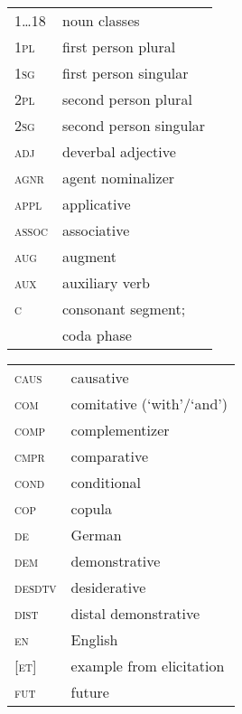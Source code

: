 \begin{multicols}{2} 


\begin{tabular}{lp{4.5cm}} 
1\ldots 18 &noun classes\\
\textsc{1pl} &first person plural\\
\textsc{1sg}&first person singular\\
\textsc{2pl}&second person plural\\
\textsc{2sg}&second person singular\\
\textsc{adj}&deverbal adjective\\
\textsc{agnr}&agent nominalizer\\
\textsc{appl}&applicative\\
\textsc{assoc}&associative\\
\textsc{aug}&augment\\
\textsc{aux}&auxiliary verb\\
\textsc{c} & consonant segment;\\
&coda phase\\
\end{tabular}
\columnbreak

\begin{tabular}{lp{4.5cm}} 
\textsc{caus}&causative\\
\textsc{com}&comitative (\lq with'/\lq and')\\
\textsc{comp}&complementizer\\
\textsc{cmpr}&comparative\\
\textsc{cond}&conditional\\
\textsc{cop}&copula\\
\textsc{de}&German\\
\textsc{dem}&demonstrative\\
\textsc{desdtv}&desiderative\\
\textsc{dist}&distal demonstrative\\
\textsc{en}&English\\
{[\textsc{et}]} & example from elicitation\\
\textsc{fut}&future\\
\end{tabular}

\pagebreak


\end{multicols}
